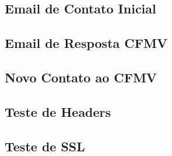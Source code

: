 
\begin{apendicesenv}

\partapendices



\begin {appendices}
\chapter{Email de Contato Inicial}

\label{apendiceA}
\end{appendices}

\begin {appendices}
\chapter{Email de Resposta CFMV}

\label{apendiceB}
\end{appendices}
\newpage

\begin {appendices}
\chapter{Novo Contato ao CFMV}

\label{apendiceC}
\end{appendices}

\begin {appendices}
\chapter{Teste de Headers}

\label{apendiceD}
\end{appendices}

\begin {appendices}
\chapter{Teste de SSL}

\label{apendiceE}
\end{appendices}


\end{apendicesenv}
